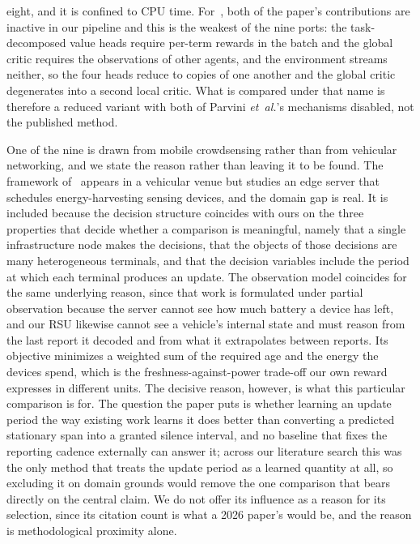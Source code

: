 \documentclass[journal]{IEEEtran}
\begin{document}
eight, and it is confined to CPU time. For~\cite{parvini2023}, both of the paper's contributions are inactive in our pipeline and this is the weakest of the nine ports: the task-decomposed value heads require per-term rewards in the batch and the global critic requires the observations of other agents, and the environment streams neither, so the four heads reduce to copies of one another and the global critic degenerates into a second local critic. What is compared under that name is therefore a reduced variant with both of Parvini \emph{et~al.}'s mechanisms disabled, not the published method.

One of the nine is drawn from mobile crowdsensing rather than from vehicular networking, and we state the reason rather than leaving it to be found. The framework of~\cite{xu2026} appears in a vehicular venue but studies an edge server that schedules energy-harvesting sensing devices, and the domain gap is real. It is included because the decision structure coincides with ours on the three properties that decide whether a comparison is meaningful, namely that a single infrastructure node makes the decisions, that the objects of those decisions are many heterogeneous terminals, and that the decision variables include the period at which each terminal produces an update. The observation model coincides for the same underlying reason, since that work is formulated under partial observation because the server cannot see how much battery a device has left, and our RSU likewise cannot see a vehicle's internal state and must reason from the last report it decoded and from what it extrapolates between reports. Its objective minimizes a weighted sum of the required age and the energy the devices spend, which is the freshness-against-power trade-off our own reward expresses in different units. The decisive reason, however, is what this particular comparison is for. The question the paper puts is whether learning an update period the way existing work learns it does better than converting a predicted stationary span into a granted silence interval, and no baseline that fixes the reporting cadence externally can answer it; across our literature search this was the only method that treats the update period as a learned quantity at all, so excluding it on domain grounds would remove the one comparison that bears directly on the central claim. We do not offer its influence as a reason for its selection, since its citation count is what a 2026 paper's would be, and the reason is methodological proximity alone.
\end{document}
